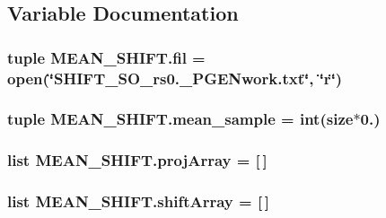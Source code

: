 \subsection{Variable Documentation}
\hypertarget{namespaceMEAN__SHIFT_a8d3baad9fa0bb397ed36b32af03a996c}{
\subsubsection[{fil}]{\setlength{\rightskip}{0pt plus 5cm}tuple M\-E\-A\-N\-\_\-\-S\-H\-I\-F\-T.\-fil = open(\char`\"{}S\-H\-I\-F\-T\-\_\-S\-O\-\_\-rs0.\-\_\-\-P\-G\-E\-Nwork.\-txt\char`\"{}, \char`\"{}r\char`\"{})}}\label{namespaceMEAN__SHIFT_a8d3baad9fa0bb397ed36b32af03a996c}
\hypertarget{namespaceMEAN__SHIFT_a082081f2418662ad1850a0ac0178eb19}{
\subsubsection[{mean\-\_\-sample}]{\setlength{\rightskip}{0pt plus 5cm}tuple M\-E\-A\-N\-\_\-\-S\-H\-I\-F\-T.\-mean\-\_\-sample = int({\bf size}$\ast$0.)}}\label{namespaceMEAN__SHIFT_a082081f2418662ad1850a0ac0178eb19}
\hypertarget{namespaceMEAN__SHIFT_acb79b39dec43809410d06cd50001c6cc}{
\subsubsection[{proj\-Array}]{\setlength{\rightskip}{0pt plus 5cm}list M\-E\-A\-N\-\_\-\-S\-H\-I\-F\-T.\-proj\-Array = \mbox{[}$\,$\mbox{]}}}\label{namespaceMEAN__SHIFT_acb79b39dec43809410d06cd50001c6cc}
\hypertarget{namespaceMEAN__SHIFT_acb855d2b8fde0351f8cc49e8f804fdce}{
\subsubsection[{shift\-Array}]{\setlength{\rightskip}{0pt plus 5cm}list M\-E\-A\-N\-\_\-\-S\-H\-I\-F\-T.\-shift\-Array = \mbox{[}$\,$\mbox{]}}}\label{namespaceMEAN__SHIFT_acb855d2b8fde0351f8cc49e8f804fdce}
